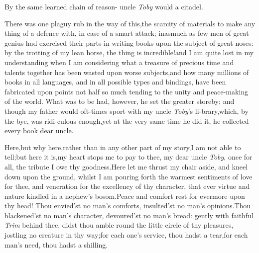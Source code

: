 \documentclass{article}
\begin{document}
By the same learned chain of reason- 
uncle \textit{Toby} would a citadel.

There was one plaguy rub in the way of this,\tsh the
scarcity of materials to make any thing of a defence with, in
case
of a smart attack; inasmuch as few men of great genius had
exercised their parts in writing books upon the subject of\break 
great noses: by the trotting of my lean horse, the thing is
incredible!\@  and I am quite lost in my understanding when I am
considering what a treasure of precious time and talents
together has been wasted upon worse subjects,\tsk and how many
millions of books in all languages, and in all possible types and
bindings, have been fabricated upon points not half so much
tending to the unity and peace-making of the world.  What was to
be had, however, he set the greater store\break by; and though my
father would oft-times sport with my uncle \textit{Toby}’s
li-\break brary,\tsk which, by the bye, was ridi-\break culous enough,\tsk yet
at the very same time he did it, he collected every book 
dear uncle.\tsh

Here,\tsh but why here,\tsh rather than in any
other part of my story,\tsh I am not able to
tell;\tsh but here it is,\tsh my heart stops me to
pay to\break
thee, my dear uncle \textit{Toby}, once for all, the tribute I
owe thy goodness.\tsh Here\break
let me thrust my chair aside, and kneel\break
down upon the ground, whilst I am\break
pouring forth the warmest sentiments\break
of love for thee, and veneration for\break
the excellency of thy character, that\break
ever virtue and nature kindled in a
nephew’s bosom.\tsh Peace and comfort rest for evermore upon thy
head!\tsk\break
Thou envied’st no man’s comforts,\tsh\break
insulted’st no man’s opinions.\tsh Thou\break
blackened’st no man’s character,\tsh\break
devoured’st no man’s bread: gently\break
with faithful \textit{Trim} behind thee, didst\break
thou amble round the little circle of\break
thy pleasures, jostling no creature in\break
thy way;\tsk for each one’s service,\break
thou hadst a tear,\tsk for each man’s\break
need, thou hadst a shilling.
\end{document}
